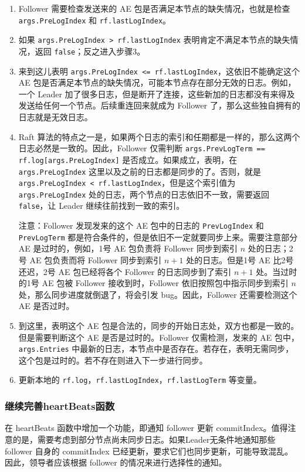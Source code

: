 \documentclass[]{article}
\begin{document}
	\begin{enumerate}
		\item Follower 需要检查发送来的 AE 包是否满足本节点的缺失情况，也就是检查 \texttt{args.PreLogIndex} 和 \texttt{rf.lastLogIndex}。
		
		\item 如果 \texttt{args.PreLogIndex > rf.lastLogIndex} 表明肯定不满足本节点的缺失情况，返回 \texttt{false}；反之进入步骤3。
		
		\item 来到这儿表明 \texttt{args.PreLogIndex <= rf.lastLogIndex}，这依旧不能确定这个 AE 包是否满足本节点的缺失情况，可能本节点存在部分无效的日志。例如，一个 Leader 加了很多日志，但是断开了连接，这些新加的日志都没有来得及发送给任何一个节点。后续重连回来就成为 Follower 了，那么这些独自拥有的日志就是无效日志。
		
		\item Raft 算法的特点之一是，如果两个日志的索引和任期都是一样的，那么这两个日志必然是一致的。因此，Follower 仅需判断 \texttt{args.PrevLogTerm == rf.log[args.PreLogIndex]} 是否成立。如果成立，表明，在 \texttt{args.PreLogIndex} 这里以及之前的日志都是同步的了。否则，就是 \texttt{args.PreLogIndex < rf.lastLogIndex}，但是这个索引值为 \texttt{args.PreLogIndex} 处的日志，两个节点的日志依旧不一致，需要返回 \texttt{false}，让 Leader 继续往前找到一致的索引。
		
		注意：Follower 发现发来的这个 AE 包中的日志的 \texttt{PrevLogIndex} 和 \texttt{PrevLogTerm} 都是符合条件的，但是依旧不一定就要同步上来。需要注意部分 AE 是过时的，例如，1号 AE 包负责将 Follower 同步到索引 $n$ 处的日志；2号 AE 包负责而将 Follower 同步到索引 $n+1$ 处的日志。但是1号 AE 比2号还迟，2号 AE 包已经将各个 Follower 的日志同步到了索引 $n+1$ 处。当过时的1号 AE 包被 Follower 接收到时，Follower 依旧按照包中指示同步到索引 $n$ 处，那么同步进度就倒退了，将会引发 bug。因此，Follower 还需要检测这个 AE 是否过时。
		
		\item 到这里，表明这个 AE 包是合法的，同步的开始日志处，双方也都是一致的。但是需要判断这个 AE 是否是过时的。Follower 仅需检测，发来的 AE 包中，\texttt{args.Entries} 中最新的日志，本节点中是否存在。若存在，表明无需同步，这个包是过时的。若不存在则进入下一步进行同步。
		
		\item 更新本地的 \texttt{rf.log}，\texttt{rf.lastLogIndex}，\texttt{rf.lastLogTerm} 等变量。
	\end{enumerate}
	
	\subsubsection{继续完善heartBeats函数}
	在 heartBeats 函数中增加一个功能，即通知 follower 更新 commitIndex。值得注意的是，需要考虑到部分节点尚未同步日志。如果Leader无条件地通知那些 follower 自身的 commitIndex 已经更新，要求它们也同步更新，可能导致混乱。因此，领导者应该根据 follower 的情况来进行选择性的通知。
	
\end{document}
